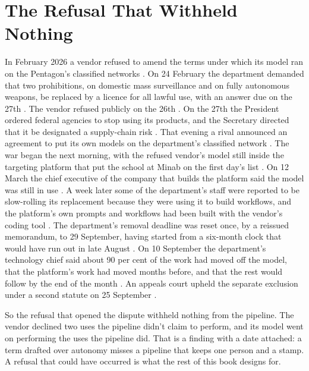 \chapter{The Refusal That Withheld Nothing}
\label{sec:2}
In February 2026 a vendor refused to amend the terms under which its model ran on the Pentagon's classified networks \autocite{cnn2026phaseout}. On 24 February the department demanded that two prohibitions, on domestic mass surveillance and on fully autonomous weapons, be replaced by a licence for all lawful use, with an answer due on the 27th \autocite{defenseone2026ultimatum,volokh2026anthropiccontract}. The vendor refused publicly on the 26th \autocite{volokh2026anthropiccontract}. On the 27th the President ordered federal agencies to stop using its products, and the Secretary directed that it be designated a supply-chain risk \autocite{npr2026openai}. That evening a rival announced an agreement to put its own models on the department's classified network \autocite{cnbc2026openai}. The war began the next morning, with the refused vendor's model still inside the targeting platform that put the school at Minab on the first day's list \autocite{crs2026iranwar,livingstone2026maven,gizmodo2026minab}. On 12 March the chief executive of the company that builds the platform said the model was still in use \autocite{cnbc2026karp}. A week later some of the department's staff were reported to be slow-rolling its replacement because they were using it to build workflows, and the platform's own prompts and workflows had been built with the vendor's coding tool \autocite{militarytimes2026removal}. The department's removal deadline was reset once, by a reissued memorandum, to 29 September, having started from a six-month clock that would have run out in late August \autocite{breakingdefense2026removal}. On 10 September the department's technology chief said about 90 per cent of the work had moved off the model, that the platform's work had moved months before, and that the rest would follow by the end of the month \autocite{defensescoop2026michael}. An appeals court upheld the separate exclusion under a second statute on 25 September \autocite{anthropic2026dowdccir}.

So the refusal that opened the dispute withheld nothing from the pipeline. The vendor declined two uses the pipeline didn't claim to perform, and its model went on performing the uses the pipeline did. That is a finding with a date attached: a term drafted over autonomy misses a pipeline that keeps one person and a stamp. A refusal that could have occurred is what the rest of this book designs for.

